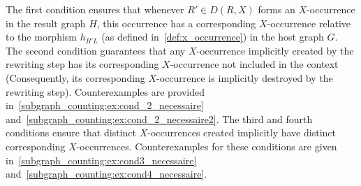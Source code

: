 The first condition ensures that whenever $R' \in D(R,X)$ forms an $X$-occurrence in the result graph $H$, this occurrence has a corresponding $X$-occurrence relative to the morphism $h_{R'L}$ (as defined in~\autoref{def:x_occurrence}) in the host graph $G$.
The second condition guarantees that any $X$-occurrence implicitly created by the rewriting step has its corresponding $X$-occurrence not included in the context (Consequently, its corresponding $X$-occurrence is implicitly destroyed by the rewriting step). Counterexamples are provided in~\autoref{subgraph_counting:ex:cond_2_necessaire} and~\autoref{subgraph_counting:ex:cond_2_necessaire2}.
The third and fourth conditions ensure that distinct $X$-occurrences created implicitly have distinct corresponding $X$-occurrences.
Counterexamples for these conditions are given in~\autoref{subgraph_counting:ex:cond3_necessaire} and~\autoref{subgraph_counting:ex:cond4_necessaire}.

